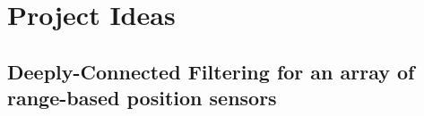 \chapter{Project Ideas}

\section{Deeply-Connected Filtering for an array of range-based position sensors}



\section{}